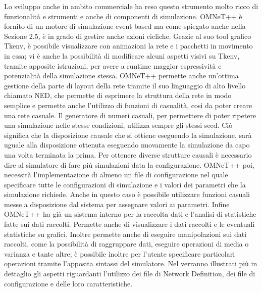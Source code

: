 Lo sviluppo anche in ambito commerciale ha reso questo strumento molto ricco di funzionalità e strumenti e anche di componenti di simulazione. OMNeT++ è fornito di un motore di simulazione event based ma come spiegato anche nella Sezione 2.5, è in grado di gestire anche azioni cicliche. Grazie al suo tool grafico Tkenv, è possibile visualizzare con animazioni la rete e i pacchetti in movimento in essa; vi è anche la possibilità di modificare alcuni aspetti visivi su Tkenv, tramite apposite istruzioni, per avere a runtime maggior espressività e potenzialità della simulazione stessa. OMNeT++ permette anche un'ottima gestione della parte di layout della rete tramite il suo linguaggio di alto livello chiamato \acf{NED}, che permette di esprimere la struttura della rete in modo semplice e permette anche l'utilizzo di funzioni di casualità, così da poter creare una rete casuale. Il generatore di numeri casuali, per permettere di poter ripetere una simulazione nelle stesse condizioni, utilizza sempre gli stessi seed. Ciò significa che la disposizione causale che si ottiene eseguendo la simulazione, sarà uguale alla disposizione ottenuta eseguendo nuovamente la simulazione da capo una volta terminata la prima. Per ottenere diverse strutture causali è necessario dire al simulatore di fare più simulazioni data la configurazione. OMNeT++ poi, necessità l'implementazione di almeno un file di configurazione nel quale specificare tutte le configurazioni di simulazione e i valori dei parametri che la simulazione richiede. Anche in questo caso è possibile utilizzare funzioni casuali messe a disposizione dal sistema per assegnare valori ai parametri. Infine OMNeT++ ha già un sistema interno per la raccolta dati e l'analisi di statistiche fatte sui dati raccolti. Permette anche di visualizzare i dati raccolti e le eventuali statistiche su grafici. Inoltre permette anche di eseguire manipolazioni sui dati raccolti, come la possibilità di raggruppare dati, eseguire operazioni di media o varianza e tante altre; è possibile inoltre per l'utente specificare particolari operazioni tramite l'apposita sintassi del simulatore. Nel  verranno illustrati più in dettaglio gli aspetti riguardanti l'utilizzo dei file di Network Definition, dei file di configurazione e delle loro caratteristiche.